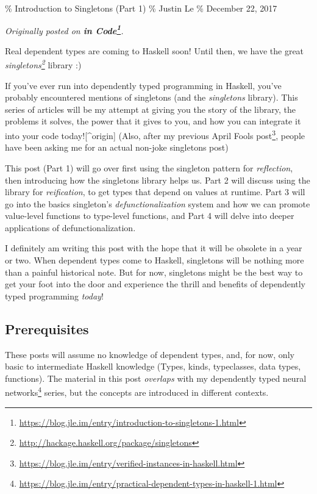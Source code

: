 \documentclass[]{article}
\renewcommand{\href}[2]{#2\footnote{\url{#1}}}
\begin{document}
\% Introduction to Singletons (Part 1) \% Justin Le \% December 22, 2017

\emph{Originally posted on
\textbf{\href{https://blog.jle.im/entry/introduction-to-singletons-1.html}{in
Code}}.}

Real dependent types are coming to Haskell soon! Until then, we have the great
\emph{\href{http://hackage.haskell.org/package/singletons}{singletons}} library
:)

If you've ever run into dependently typed programming in Haskell, you've
probably encountered mentions of singletons (and the \emph{singletons} library).
This series of articles will be my attempt at giving you the story of the
library, the problems it solves, the power that it gives to you, and how you can
integrate it into your code today!{[}\^{}origin{]} (Also, after
\href{https://blog.jle.im/entry/verified-instances-in-haskell.html}{my previous
April Fools post}, people have been asking me for an actual non-joke singletons
post)

This post (Part 1) will go over first using the singleton pattern for
\emph{reflection}, then introducing how the singletons library helps us. Part 2
will discuss using the library for \emph{reification}, to get types that depend
on values at runtime. Part 3 will go into the basics singleton's
\emph{defunctionalization} system and how we can promote value-level functions
to type-level functions, and Part 4 will delve into deeper applications of
defunctionalization.

I definitely am writing this post with the hope that it will be obsolete in a
year or two. When dependent types come to Haskell, singletons will be nothing
more than a painful historical note. But for now, singletons might be the best
way to get your foot into the door and experience the thrill and benefits of
dependently typed programming \emph{today}!

\subsection{Prerequisites}

These posts will assume no knowledge of dependent types, and, for now, only
basic to intermediate Haskell knowledge (Types, kinds, typeclasses, data types,
functions). The material in this post \emph{overlaps} with my
\href{https://blog.jle.im/entry/practical-dependent-types-in-haskell-1.html}{dependently
typed neural networks} series, but the concepts are introduced in different
contexts.
\end{document}
